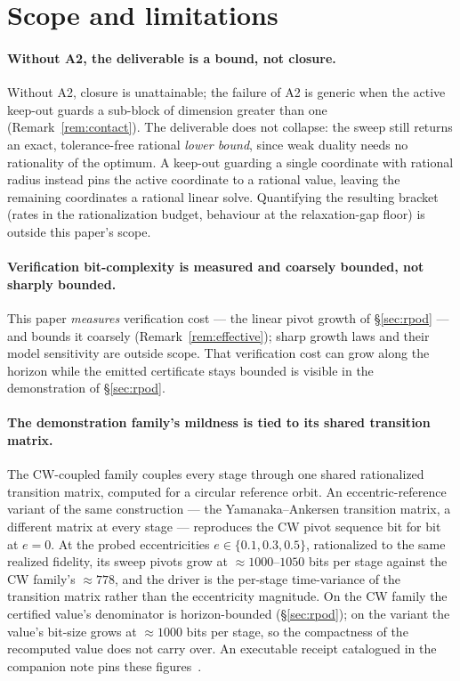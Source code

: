\documentclass[11pt]{article}
\theoremstyle{definition}
\theoremstyle{remark}
\renewcommand{\_}{\ifdim\fontdimen3\font=0pt\relax\char`\_\else\textunderscore\fi\hspace{0pt}}
\begin{document}
\section{Scope and limitations}\label{sec:limits}

\paragraph{Without A2, the deliverable is a bound, not closure.} Without A2,
closure is unattainable; the failure of A2 is generic when the active
keep-out guards a sub-block of dimension greater than one
(Remark~\ref{rem:contact}). The deliverable does not collapse: the sweep
still returns an exact, tolerance-free rational \emph{lower bound}, since
weak duality needs no rationality of the optimum. A keep-out guarding a
single coordinate with rational radius instead pins the active coordinate to
a rational value, leaving the remaining coordinates a rational linear solve.
Quantifying the resulting bracket (rates in the rationalization budget,
behaviour at the relaxation-gap floor) is outside this paper's scope.

\paragraph{Verification bit-complexity is measured and coarsely bounded, not
sharply bounded.} This paper \emph{measures} verification cost --- the linear
pivot growth of \S\ref{sec:rpod} --- and bounds it coarsely
(Remark~\ref{rem:effective}); sharp growth laws and their model sensitivity
are outside scope. That verification cost can grow along the horizon while
the emitted certificate stays bounded is visible in the demonstration of
\S\ref{sec:rpod}.

\paragraph{The demonstration family's mildness is tied to its shared
transition matrix.} The CW-coupled family couples every stage through one
shared rationalized transition matrix, computed for a circular reference
orbit. An eccentric-reference variant of the same construction --- the
Yamanaka--Ankersen transition matrix, a different matrix at every stage ---
reproduces the CW pivot sequence bit for bit at $e=0$. At the probed
eccentricities $e\in\{0.1,0.3,0.5\}$, rationalized to the same realized
fidelity, its sweep pivots
grow at $\approx1000$--$1050$ bits per stage against the CW family's
$\approx778$, and the driver is the per-stage time-variance of the
transition matrix rather than the eccentricity magnitude. On the CW family
the certified value's denominator is horizon-bounded (\S\ref{sec:rpod}); on
the variant the value's bit-size grows at $\approx1000$ bits per stage, so
the compactness of the recomputed value does not carry over. An executable
receipt catalogued in the companion note pins these
figures~\cite{leannote}.
\end{document}
